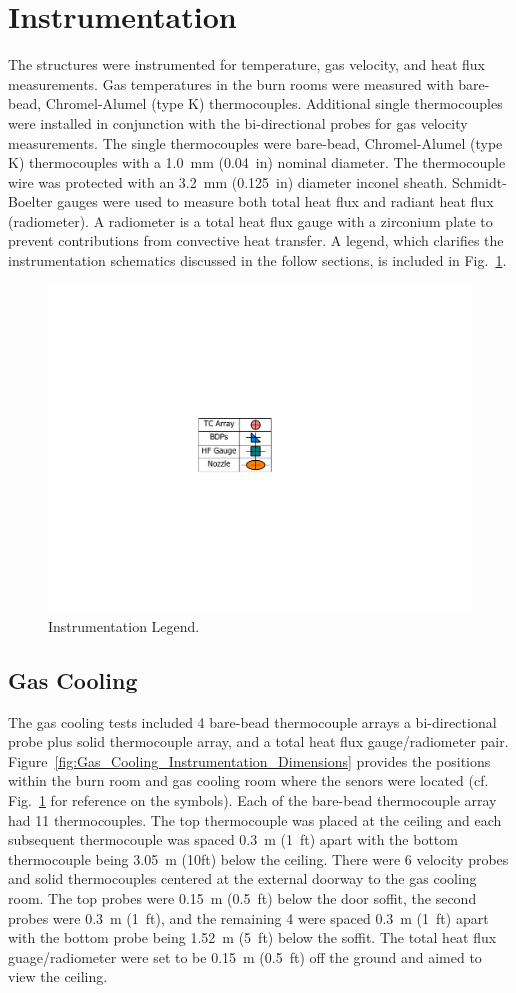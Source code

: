 \documentclass[12pt,oneside]{book}
\begin{document}
\clearpage

\section{Instrumentation}
\label{sec:Instrumentation}

The structures were instrumented for temperature, gas velocity, and heat flux measurements. Gas temperatures in the burn rooms were measured with bare-bead, Chromel-Alumel (type K) thermocouples. Additional single thermocouples were installed in conjunction with the bi-directional probes for gas velocity measurements. The single thermocouples were bare-bead, Chromel-Alumel (type K) thermocouples with a 1.0~mm (0.04~in) nominal diameter. The thermocouple wire was protected with an 3.2~mm (0.125~in) diameter inconel sheath. Schmidt-Boelter gauges were used to measure both total heat flux and radiant heat flux (radiometer). A radiometer is a total heat flux gauge with a zirconium plate to prevent contributions from convective heat transfer. A legend, which clarifies the instrumentation schematics discussed in the follow sections, is included in Fig.~\ref{fig:Instrumentation_Legend}.

\begin{figure}[!ht]
	\includegraphics[width=.35\columnwidth]{../Figures/Floor_Plans/PDFs/DelCo_2012_Instrumentation_Legend.pdf}
	\caption{Instrumentation Legend.}
	\label{fig:Instrumentation_Legend}
\end{figure}

\subsection{Gas Cooling}
\label{subsec:Gas_Cooling_Instrumentation}

The gas cooling tests included 4 bare-bead thermocouple arrays  a bi-directional probe plus solid thermocouple array, and a total heat flux gauge/radiometer pair. Figure~\ref{fig:Gas_Cooling_Instrumentation_Dimensions} provides the positions within the burn room and gas cooling room where the senors were located (cf. Fig.~\ref{fig:Instrumentation_Legend} for reference on the symbols). Each of the bare-bead thermocouple array had 11 thermocouples. The top thermocouple was placed at the ceiling and each subsequent thermocouple was spaced 0.3~m (1~ft) apart with the bottom thermocouple being 3.05~m (10ft) below the ceiling. There were 6 velocity probes and solid thermocouples centered at the external doorway to the gas cooling room. The top probes were 0.15~m (0.5~ft) below the door soffit, the second probes were 0.3~m (1~ft), and the remaining 4 were spaced 0.3~m (1~ft) apart with the bottom probe being 1.52~m (5~ft) below the soffit. The total heat flux guage/radiometer were set to be 0.15~m (0.5~ft) off the ground and aimed to view the ceiling.
\end{document}
